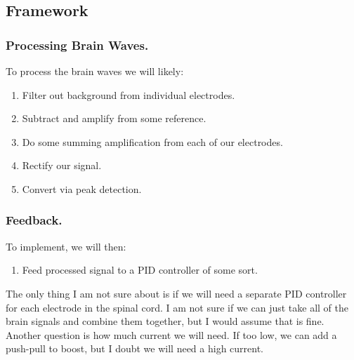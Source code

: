 \documentclass[12pt]{report}
\begin{document}
\subsection{Framework}

\subsubsection{Processing Brain Waves.}
To process the brain waves we will likely:

\begin{enumerate}
    \item Filter out background from individual electrodes. 
    \item Subtract and amplify from some reference.
    \item Do some summing amplification from each of our electrodes.
    \item Rectify our signal.
    \item Convert via peak detection.
\end{enumerate}

\subsubsection{Feedback.}
To implement, we will then: 

\begin{enumerate}
    \item Feed processed signal to a PID controller of some sort.
\end{enumerate}

The only thing I am not sure about is if we will need a separate PID controller for each electrode in the spinal cord. I am not sure if we can just take all of the brain signals and combine them together, but I would assume that is fine. Another question is how much current we will need. If too low, we can add a push-pull to boost, but I doubt we will need a high current. 













\vfill\pagebreak



\pagecolor{black}\afterpage{\nopagecolor}


       \vspace*{1in}
       
\end{document}
